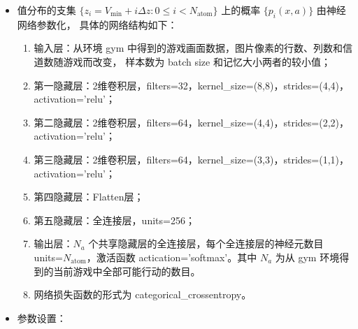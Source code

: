 \documentclass[UTF8]{ctexart}
\begin{document}
\begin{itemize}
\begin{enumerate}
    \end{enumerate}
\item 值分布的支集 $\{z_i = V_{\min}+i\Delta z:0\leq i< N_{\text{atom}}\}$ 上的概率 $\{p_i(x,a)\}$ 由神经网络参数化，
        具体的网络结构如下：
        \begin{enumerate}
            \item 输入层：从环境 gym 中得到的游戏画面数据，图片像素的行数、列数和信道数随游戏而改变，
                样本数为 batch size 和记忆大小两者的较小值；
            \item 第一隐藏层：2维卷积层，filters=32，kernel\_size=(8,8)，strides=(4,4)，activation='relu'；
            \item 第二隐藏层：2维卷积层，filters=64，kernel\_size=(4,4)，strides=(2,2)，activation='relu'；
            \item 第三隐藏层：2维卷积层，filters=64，kernel\_size=(3,3)，strides=(1,1)，activation='relu'；
            \item 第四隐藏层：Flatten层；
            \item 第五隐藏层：全连接层，units=256；
            \item 输出层：$N_a$ 个共享隐藏层的全连接层，每个全连接层的神经元数目 units=$N_{\text{atom}}$，激活函数
                    actication='softmax'。其中 $N_a$ 为从 gym 环境得到的当前游戏中全部可能行动的数目。
            \item [~]网络损失函数的形式为 categorical\_crossentropy。
        \end{enumerate}
\item 参数设置：
\begin{table}[h]
\centering
\begin{tabular}{|c|c|c|c|c|c|c|c|c|c|}
\hline


\end{tabular}
\end{table}
\end{itemize}
\end{document}
